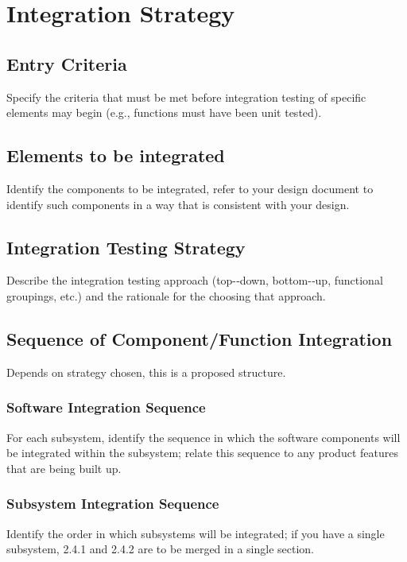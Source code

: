 \section{Integration Strategy}

\subsection{Entry Criteria}
Specify the criteria that must be met before integration testing of specific elements may begin (e.g., functions must have been unit tested).

\subsection{Elements to be integrated}
Identify the components to be integrated, refer to your design document to identify such components in a way that is consistent with your design.

\subsection{Integration Testing Strategy}
Describe the integration testing approach (top-­‐down, bottom-­‐up, functional groupings, etc.) and the rationale for the choosing that approach.

\subsection{Sequence of Component/Function Integration}
Depends on strategy chosen, this is a proposed structure.

\subsubsection{Software Integration Sequence}
For each subsystem, identify the sequence in which the software components will be integrated within the subsystem; relate this sequence to any product features that are being built up.

\subsubsection{Subsystem Integration Sequence}
Identify the order in which subsystems will be integrated; if you have a single subsystem, 2.4.1 and 2.4.2 are to be merged in a single section.
